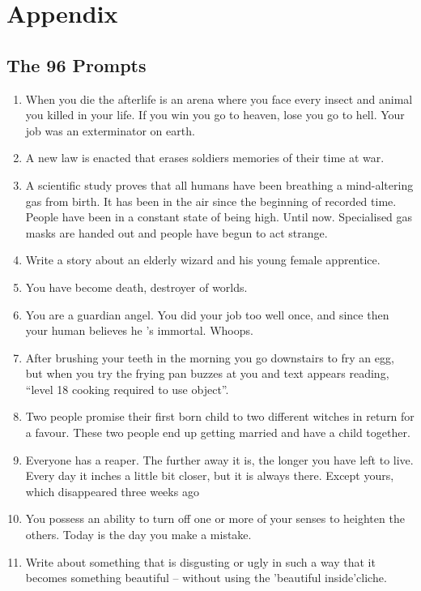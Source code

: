 \chapter{Appendix}

\section{The 96 {\hanna} Prompts}
\label{sec:all_prompts}

\begin{enumerate}[noitemsep]
    \item When you die the afterlife is an arena where you face every insect and animal you killed in your life. If you win you go to heaven, lose you go to hell. Your job was an exterminator on earth.
    \item A new law is enacted that erases soldiers memories of their time at war.
    \item A scientific study proves that all humans have been breathing a mind-altering gas from birth. It has been in the air since the beginning of recorded time. People have been in a constant state of being high. Until now. Specialised gas masks are handed out and people have begun to act strange.
    \item Write a story about an elderly wizard and his young female apprentice.
    \item You have become death, destroyer of worlds.
    \item You are a guardian angel. You did your job too well once, and since then your human believes he 's immortal. Whoops.
    \item After brushing your teeth in the morning you go downstairs to fry an egg, but when you try the frying pan buzzes at you and text appears reading, “level 18 cooking required to use object”.
    \item Two people promise their first born child to two different witches in return for a favour. These two people end up getting married and have a child together.
    \item Everyone has a reaper. The further away it is, the longer you have left to live. Every day it inches a little bit closer, but it is always there. Except yours, which disappeared three weeks ago
    \item You possess an ability to turn off one or more of your senses to heighten the others. Today is the day you make a mistake.
    \item Write about something that is disgusting or ugly in such a way that it becomes something beautiful -- without using the 'beautiful inside'cliche.

\end{enumerate}

